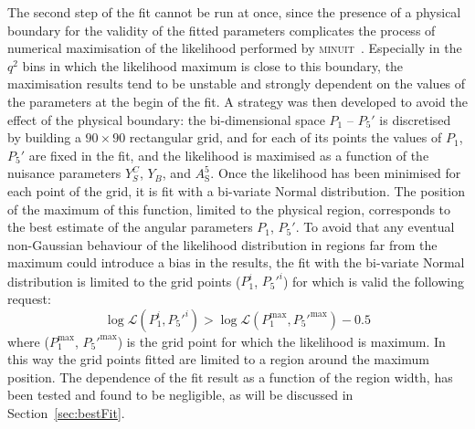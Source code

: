 The second step of the fit cannot be run at once, since the presence of a physical boundary for the validity of the fitted parameters complicates the process of numerical maximisation of the likelihood performed by \textsc{minuit}~\cite{Minuit}.
Especially in the $q^2$ bins in which the likelihood maximum is close to this boundary, the maximisation results tend to be unstable and strongly dependent on the values of the parameters at the begin of the fit.
A strategy was then developed to avoid the effect of the physical boundary: the bi-dimensional space $P_1$ -- $P_5'$ is discretised by building a $90\times90$ rectangular grid, and for each of its points the values of $P_1$, $P_5'$ are fixed in the fit, and the likelihood is maximised as a function of the nuisance parameters $Y^{C}_{S}$, $Y_{B}$, and $A^5_\mathrm{S}$.
Once the likelihood has been minimised for each point of the grid, it is fit with a bi-variate Normal distribution.
The position of the maximum of this function, limited to the physical region, corresponds to the best estimate of the angular parameters $P_1$, $P_5'$.
To avoid that any eventual non-Gaussian behaviour of the likelihood distribution in regions far from the maximum could introduce a bias in the results, the fit with the bi-variate Normal distribution is limited to the grid points ($P_1^i$, $P_5'^i$) for which is valid the following request: $$\log\mathcal{L}(P_1^i,P_5'^i) > \log\mathcal{L}(P_1^{\mathrm{max}},P_5'^{\mathrm{max}}) - 0.5$$ where ($P_1^{\mathrm{max}}$, $P_5'^{\mathrm{max}}$) is the grid point for which the likelihood is maximum.
In this way the grid points fitted are limited to a region around the maximum position.
The dependence of the fit result as a function of the region width, has been tested and found to be negligible, as will be discussed in Section~\ref{sec:bestFit}.


